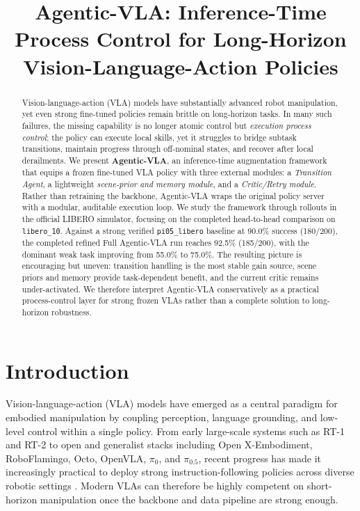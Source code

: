 \documentclass[a4paper]{Template/LaTeX_Templates/waica}
\begin{document}
\title{Agentic-VLA: Inference-Time Process Control for Long-Horizon Vision-Language-Action Policies}
\author{}
\institute{}


\maketitle

\begin{abstract}
Vision-language-action (VLA) models have substantially advanced robot manipulation, yet even strong fine-tuned policies remain brittle on long-horizon tasks. In many such failures, the missing capability is no longer atomic control but \emph{execution process control}: the policy can execute local skills, yet it struggles to bridge subtask transitions, maintain progress through off-nominal states, and recover after local derailments. We present \textbf{Agentic-VLA}, an inference-time augmentation framework that equips a frozen fine-tuned VLA policy with three external modules: a \textit{Transition Agent}, a lightweight \textit{scene-prior and memory module}, and a \textit{Critic/Retry module}. Rather than retraining the backbone, Agentic-VLA wraps the original policy server with a modular, auditable execution loop. We study the framework through rollouts in the official LIBERO simulator, focusing on the completed head-to-head comparison on \texttt{libero\_10}. Against a strong verified \texttt{pi05\_libero} baseline at 90.0\% success (180/200), the completed refined Full Agentic-VLA run reaches 92.5\% (185/200), with the dominant weak task improving from 55.0\% to 75.0\%. The resulting picture is encouraging but uneven: transition handling is the most stable gain source, scene priors and memory provide task-dependent benefit, and the current critic remains under-activated. We therefore interpret Agentic-VLA conservatively as a practical process-control layer for strong frozen VLAs rather than a complete solution to long-horizon robustness.
\end{abstract}

\section{Introduction}

Vision-language-action (VLA) models have emerged as a central paradigm for embodied manipulation by coupling perception, language grounding, and low-level control within a single policy. From early large-scale systems such as RT-1 and RT-2 to open and generalist stacks including Open X-Embodiment, RoboFlamingo, Octo, OpenVLA, $\pi_0$, and $\pi_{0.5}$, recent progress has made it increasingly practical to deploy strong instruction-following policies across diverse robotic settings \cite{rt1,rt2,openx,roboflamingo,octo,openvla,pi0,pi05,fast,greenvla,everydayvla}. Modern VLAs can therefore be highly competent on short-horizon manipulation once the backbone and data pipeline are strong enough.
\end{document}
